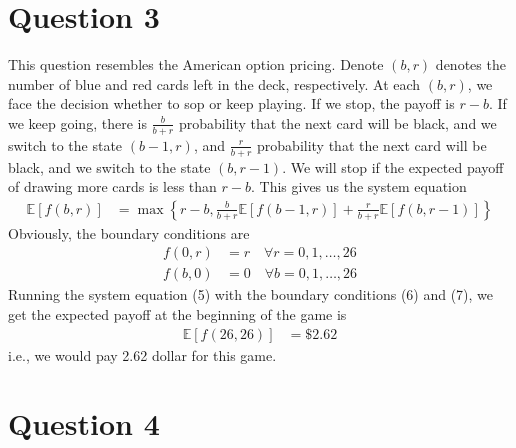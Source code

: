 \documentclass[12pt]{article}
\begin{document}
\section*{Question 3}
\begin{solution}
This question resembles the American option pricing. Denote $(b,r)$ denotes the number of blue and red cards left in the deck, respectively. At each $(b,r)$, we face the decision whether to sop or keep playing. If we stop, the payoff is $r-b$. If we keep going, there is $\frac{b}{b+r}$ probability that the next card will be black, and we switch to the state $(b-1,r)$, and  $\frac{r}{b+r}$ probability that the next card will be black, and we switch to the state $(b,r-1)$. We will stop if the expected payoff of drawing more cards is less than $r-b$. This gives us the system equation
\begin{align}
\mathbb{E}\left[f(b,r)\right] &=\max\left\{r-b,\frac{b}{b+r}\mathbb{E}\left[f(b-1,r)\right] +\frac{r}{b+r}\mathbb{E}\left[f(b,r-1)\right]  \right\}
\end{align}
Obviously, the boundary conditions are 
\begin{align}
f(0,r) &= r\quad \forall r =0,1,\ldots,26\\
f(b,0) &= 0\quad \forall b =0,1,\ldots,26
\end{align}
Running the system equation (5) with the boundary conditions (6) and (7), we get the expected payoff at the beginning of the game is 
\begin{align}
\mathbb{E}\left[f(26,26)\right] &= \$2.62
\end{align}
i.e., we would pay 2.62 dollar for this game.
\end{solution}

\section*{Question 4}
\begin{solution}
\end{solution}
\end{document}
